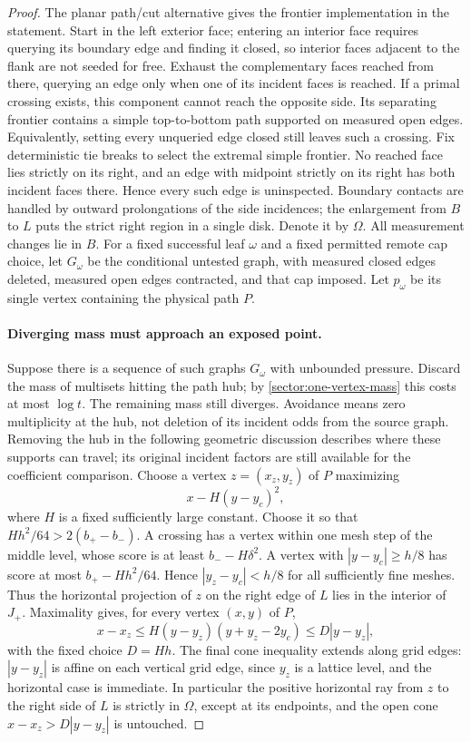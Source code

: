 \begin{proof}
The planar path/cut alternative gives the frontier implementation in
the statement.  Start in the left exterior face; entering an interior
face requires querying its boundary edge and finding it closed, so
interior faces adjacent to the flank are not seeded for free.  Exhaust
the complementary faces reached from there, querying an edge only
when one of its incident faces is reached.
If a primal crossing exists, this component cannot reach the opposite
side.  Its separating frontier contains a simple top-to-bottom path
supported on measured open edges.  Equivalently, setting every
unqueried edge closed still leaves such a crossing.  Fix deterministic
tie breaks to select the extremal simple frontier.  No reached face
lies strictly on its right, and an edge with midpoint strictly on its
right has both incident faces there.  Hence every such edge is
uninspected.  Boundary contacts are handled by outward prolongations
of the side incidences; the enlargement from $B$ to $L$ puts the
strict right region in a single disk.  Denote it by $\Omega$.
All measurement changes lie in $B$.  For a fixed successful leaf
$\omega$ and a fixed permitted remote cap choice, let $G_\omega$ be
the conditional untested graph, with measured closed edges deleted,
measured open edges contracted, and that cap imposed.  Let $p_\omega$
be its single vertex containing the physical path $P$.

\paragraph{Diverging mass must approach an exposed point.}
Suppose there is a sequence of such graphs $G_\omega$ with
unbounded pressure.  Discard the mass of multisets hitting the path
hub; by \eqref{sector:one-vertex-mass} this costs at most $\log t$.
The remaining mass still diverges.  Avoidance means zero multiplicity
at the hub, not deletion of its incident odds from the source graph.
Removing the hub in the following geometric discussion describes
where these supports can travel; its original incident factors are
still available for the coefficient comparison.  Choose a vertex
$z=(x_z,y_z)$ of $P$ maximizing
\[
 x-H(y-y_c)^2,
\]
where $H$ is a fixed sufficiently large constant.  Choose it so that
$Hh^2/64>2(b_+-b_-)$.  A crossing has a vertex within one mesh step
of the middle level, whose score is at least $b_- -H\delta^2$.
A vertex with $|y-y_c|\ge h/8$ has score at most
$b_+-Hh^2/64$.  Hence $|y_z-y_c|<h/8$ for all sufficiently fine meshes.
Thus the horizontal projection of $z$ on the right edge of $L$
lies in the interior of $J_+$.  Maximality gives, for every
vertex $(x,y)$ of $P$,
\begin{equation}
 x-x_z\le H(y-y_z)(y+y_z-2y_c)\le D|y-y_z|,
 \label{sector:cone-bound}
\end{equation}
with the fixed choice $D=Hh$.  The final cone inequality extends along
grid edges: $|y-y_z|$ is affine on each vertical grid edge, since $y_z$
is a lattice level, and the horizontal case is immediate.
In particular the positive horizontal ray from $z$ to the right side
of $L$ is
strictly in $\Omega$, except at its endpoints, and the open cone
$x-x_z>D|y-y_z|$ is untouched.


\end{proof}
